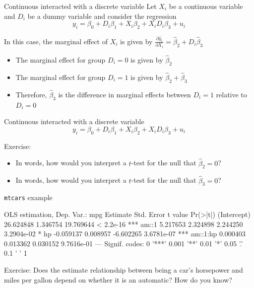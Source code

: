 \documentclass[aspectratio=169,t,11pt,table]{beamer}
\begin{document}
\begin{frame}{Continuous interacted with a discrete variable}
  Let $X_i$ be a continuous variable and $D_i$ be a dummy variable and consider the regression
  $$
    y_i = \beta_0 + D_i \beta_1 + X_i \beta_2 + X_i D_i \beta_3 + u_i
  $$
  
  \pause
  \bigskip
  In this case, the marginal effect of $X_i$ is given by 
  $\frac{\partial \hat{y}_i}{\partial X_i} = \hat{\beta}_2 + D_i \hat{\beta}_3$ 
  \begin{itemize}
    \item The marginal effect for group $D_i = 0$ is given by $\hat{\beta}_2$
    \item The marginal effect for group $D_i = 1$ is given by $\hat{\beta}_2 + \hat{\beta}_3$
    
    \pause
    \item Therefore, $\hat{\beta}_3$ is the difference in marginal effects between $D_i = 1$ relative to $D_i = 0$
  \end{itemize}
\end{frame}


\begin{frame}{Continuous interacted with a discrete variable}
  \vspace*{-\bigskipamount}
  $$
    y_i = \beta_0 + D_i \beta_1 + X_i \beta_2 + X_i D_i \beta_3 + u_i
  $$
  
  \bigskip
  Exercise: 
  \begin{itemize}
    \item In words, how would you interpret a $t$-test for the null that $\hat{\beta}_2 = 0$?
    
    \item In words, how would you interpret a $t$-test for the null that $\hat{\beta}_3 = 0$?
  \end{itemize}
\end{frame}

\begin{frame}[fragile]{\texttt{mtcars} example}
  \vspace{-\bigskipamount}
  \begin{codeblock}[{}]
OLS estimation, Dep. Var.: mpg
              Estimate Std. Error   t value   Pr(>|t|)    
(Intercept) 26.624848   1.346754 19.769644  < 2.2e-16 ***
am::1        5.217653   2.324898  2.244250 3.2904e-02 *  
hp          -0.059137   0.008957 -6.602265 3.6781e-07 ***
am::1:hp     0.000403   0.013362  0.030152 9.7616e-01    
---
Signif. codes:  0 '***' 0.001 '**' 0.01 '*' 0.05 '.' 0.1 ' ' 1
  \end{codeblock}

  Exercise: Does the estimate relationship between being a car's horsepower and miles per gallon depend on whether it is an automatic? How do you know?
\end{frame}
\end{document}

